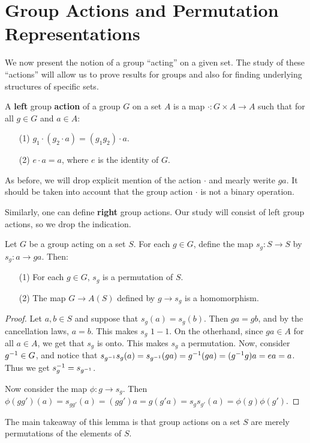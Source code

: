 \section{Group Actions and Permutation Representations}
\label{section_4.1}

We now present the notion of a group ``acting'' on a given set. The study of
these ``actions'' will allow us to prove results for groups and also for finding
underlying structures of specific sets.

\begin{definition}
  A \textbf{left} group \textbf{action} of a group $G$ on a set  $A$ is a map
  $\cdot: G \times A
  \rightarrow A$ such that for all $g \in G$ and  $a \in A$:
  \begin{enumerate}
    \item[(1)] $g_1 \cdot (g_2 \cdot a)=(g_1g_2) \cdot a$.

    \item[(2)] $e \cdot a=a$, where  $e$ is the identity of  $G$.
  \end{enumerate}
\end{definition}
\begin{remark}
  As before, we will drop explicit mention of the action $\cdot$ and mearly
  werite $ga$. It should be taken into account that the group action $\cdot$
  is not a binary operation.
\end{remark}
\begin{remark}
  Similarly, one can define \textbf{right} group actions. Our study will
  consist of left group actions, so we drop the indication.
\end{remark}

\begin{lemma}\label{lemma_4.1.1}
  Let $G$ be a group acting on a set $S$. For each $g \in G$, define the map
  $s_g:S \rightarrow S$ by $s_g:a \rightarrow ga$. Then:
  \begin{enumerate}
    \item[(1)] For each $g \in G$,  $s_g$ is a permutation of  $S$.

    \item [(2)] The map $G \rightarrow A(S)$ defined by $g \rightarrow
      s_g$ is a homomorphism.
  \end{enumerate}
\end{lemma}
\begin{proof}
  Let $a,b \in S$ and suppose that $s_g(a)=s_g(b)$. Then $ga=gb$,
  and by the cancellation laws,  $a=b$. This makes $s_g$  $1-1$. On the
  otherhand, since $ga \in A$ for all $a \in A$, we get that $s_g$ is
  onto. This makes  $s_g$ a permutation. Now, consider  $g^{-1} \in G$,
  and notice that
  $s_{g^{-1}}s_g(a)=s_{g^{-1}}(ga)=g^{-1}(ga)=(g^{-1}g)a=ea=a$.
  Thus we get $s_g^{-1}=s_{g^{-1}}$.

  Now consider the map $\phi:g \rightarrow s_g$. Then
  $\phi(gg')(a)=s_{gg'}(a)=(gg')a=g(g'a)=s_gs_{g'}(a)= \phi(g)\phi(g')$.
\end{proof}
\begin{remark}
  The main takeaway of this lemma is that group actions on a set $S$ are
  merely permutations of the elements of  $S$.
\end{remark}

